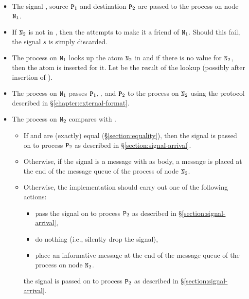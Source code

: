 \begin{itemize}
\item {}
The signal , source ${\tt{\sl P}}_1$ and destination ${\tt{\sl P}}_2$ are
passed to the  process on node ${\tt{\sl N}}_1$.
\item If ${\tt{\sl N}}_2$ is not in
, then the 
attempts to make it a friend of ${\tt{\sl N}}_1$.  Should this fail, the
signal $s$ is simply discarded.
\item The  process on ${\tt{\sl N}}_1$ looks up
the atom ${\tt{\sl N}}_2$ in
 and 
if there is no value for ${\tt{\sl N}}_2$, then the atom
is inserted for it.  Let  be the result of the lookup
(possibly after insertion of ).
\item The  process on ${\tt{\sl N}}_1$ passes
${\tt{\sl P}}_1$, ,  and ${\tt{\sl P}}_2$ to the 
process on ${\tt{\sl N}}_2$
using the protocol described in \S\ref{chapter:external-format}.
\item The  process on ${\tt{\sl N}}_2$ compares
 with .
\begin{itemize}
\item If  and  are (exactly) equal
(\S\ref{section:equality}), then the signal  is passed on to
process ${\tt{\sl P}}_2$ as described in \S\ref{section:signal-arrival}.
\item Otherwise, if the signal  is a message with  as body, a message
 is placed at the end of the
message queue of the  process of node ${\tt{\sl N}}_2$.
\item Otherwise,
\ifStd
the implementation should carry out one of the following actions:
\begin{itemize}
\item pass the signal 
on to process ${\tt{\sl P}}_2$ as described in \S\ref{section:signal-arrival},
\item do nothing (i.e., silently drop the signal),
\item place an informative message at the end of the
message queue of the  process on node ${\tt{\sl N}}_2$.
\end{itemize}
\fi
\ifOld
the signal is passed on to
process ${\tt{\sl P}}_2$ as described in \S\ref{section:signal-arrival}.
\fi
\end{itemize}
\end{itemize}

